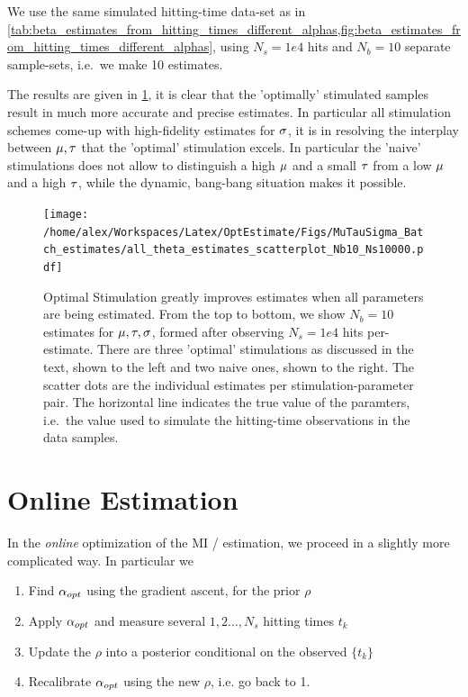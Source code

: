 \documentclass{article}
\begin{document}
We use the same simulated hitting-time data-set as in
\cref{tab:beta_estimates_from_hitting_times_different_alphas,fig:beta_estimates_from_hitting_times_different_alphas},
using $N_s=1e4$ hits and $N_b=10$ separate sample-sets, i.e.\ we make 10
estimates.

The results are given in \cref{fig:all_theta_estimates_batch}, it is clear that
the 'optimally' stimulated samples result in much more accurate and precise
estimates. In particular all stimulation schemes come-up with high-fidelity
estimates for ${\sigma }$, it is in resolving the interplay between ${\mu },{ \tau }$ that the
'optimal' stimulation excels. In particular the 'naive' stimulations does
not allow to distinguish a high ${\mu }$ and a small ${ \tau }$ from a low ${\mu }$
and a high ${ \tau }$, while the dynamic, bang-bang situation makes it possible.

\begin{figure}[htp]
\begin{center}
  \texttt{[image: /home/alex/Workspaces/Latex/OptEstimate/Figs/MuTauSigma\_Batch\_estimates/all\_theta\_estimates\_scatterplot\_Nb10\_Ns10000.pdf]}
  \caption[Batch estimates for all 3 parameters]{Optimal Stimulation greatly
  improves estimates when all parameters are being estimated. 
  From the top to bottom, we show $N_b=10$ estimates for ${\mu },{ \tau },{\sigma }$,
  formed after observing $N_s=1e4$ hits per-estimate. There are three 'optimal'
  stimulations as discussed in the text, shown to the left and two naive ones,
  shown to the right. The scatter dots are the individual estimates per
  stimulation-parameter pair. The horizontal line indicates the true value of
  the paramters, i.e.\ the value used to simulate the hitting-time observations
  in the data samples.}
  \label{fig:all_theta_estimates_batch}
\end{center}
\end{figure}

\clearpage

\section{Online Estimation}
\label{sec:online_estimation} 
In the {\sl online} optimization of the MI / estimation, we proceed in a
slightly more complicated way. In particular we 

\begin{enumerate}
  \item Find ${{\alpha}_{opt} }$ using the gradient ascent, for the prior $\rho$
  \item Apply ${{\alpha}_{opt} }$ and measure several $1,2\ldots,N_{s}$ hitting times
  $t_k$
  \item Update the $\rho$ into a posterior conditional on the observed $\{t_k\}$
  \item Recalibrate ${{\alpha}_{opt} }$ using the new $\rho$, i.e. go back to 1. 
\end{enumerate}
\end{document}
